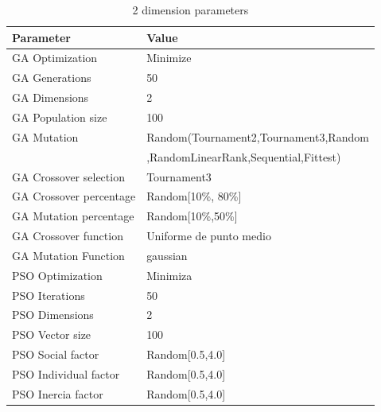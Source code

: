 \documentclass[runningheads]{llncs}
\begin{document}
   \begin{table}[htp]
    \caption{2 dimension parameters}
    \label{table:ga-pso-parameters-2}
    \centering
    \begin{tabular}{|l|l|}
    \hline
    Parameter & Value \\
    \hline
    \hline
    GA Optimization & Minimize \\
    \hline
    GA Generations & 50 \\
    \hline
    GA Dimensions & 2 \\
    \hline
    GA Population size & 100 \\
    \hline
    GA Mutation & Random(Tournament2,Tournament3,Random \\
    &  ,RandomLinearRank,Sequential,Fittest)\\
    \hline
    GA Crossover selection & Tournament3 \\
    \hline
    GA Crossover percentage & Random[10\%, 80\%] \\
    \hline
    GA Mutation percentage & Random[10\%,50\%] \\
    \hline
    GA Crossover function & Uniforme de punto medio \\
    \hline
    GA Mutation Function & gaussian \\
    \hline
    PSO Optimization & Minimiza \\
    \hline
    PSO Iterations & 50 \\
    \hline
    PSO Dimensions & 2 \\
    \hline
    PSO Vector size & 100 \\
    \hline
    PSO Social factor & Random[0.5,4.0] \\
    \hline
    PSO Individual factor & Random[0.5,4.0] \\
    \hline
    PSO Inercia factor & Random[0.5,4.0] \\
    \hline
    \end{tabular}
    \end{table}


  
\end{document}
